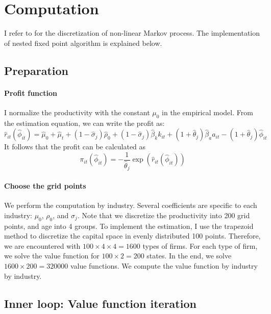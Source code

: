 
\section{Computation}
I refer to \citet{farmer2017} for the discretization of non-linear Markov process. The implementation of nested fixed point algorithm is explained below.

\subsection{Preparation}
\paragraph{Profit function}

I normalize the productivity with the constant $\mu_{0}$ in the
empirical model. From the estimation equation, we can write the profit
as:
\begin{equation}
\hat{r}_{it}\left(\hat{\phi}_{it}\right)=\hat{\mu}_{0}+\hat{\mu}_{t}+\left(1-\hat{\sigma}_{j}\right)\hat{\rho}_{0}+\left(1-\hat{\sigma}_{j}\right)\hat{\beta}_{k}k_{it}+\left(1+\hat{\theta}_{j}\right)\hat{\beta}_{a}a_{it}-\left(1+\hat{\theta}_{j}\right)\hat{\phi}_{it}
\end{equation}
It follows that the profit can be calculated as 
\begin{equation}
\pi_{it}\left(\hat{\phi}_{it}\right)=-\frac{1}{\hat{\theta}_{j}}\exp\left(\hat{r}_{it}\left(\hat{\phi}_{it}\right)\right)
\end{equation}

\paragraph{Choose the grid points}

We perform the computation by industry. Several coefficients are specific
to each industry: $\mu_{0}$, $\rho_{0}$, and $\sigma_{j}$. Note
that we discretize the productivity into 200 grid points, and age
into 4 groups. To implement the estimation, I use the trapezoid method
to discretize the capital space in evenly distributed 100 points.
Therefore, we are encountered with $100\times4\times4=1600$ types
of firms. For each type of firm, we solve the value function for $100\times2=200$
states. In the end, we solve $1600\times200=320000$ value functions.
We compute the value function by industry by industry. 

\subsection{Inner loop: Value function iteration}

